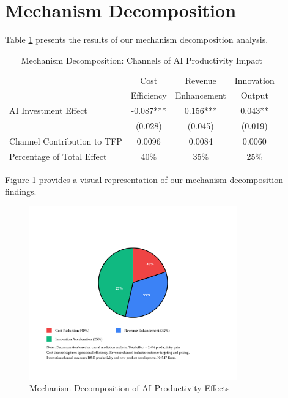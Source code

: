 \documentclass[12pt]{article}
\begin{document}
\section{Mechanism Decomposition}

Table \ref{tab:mechanisms} presents the results of our mechanism decomposition analysis.

\begin{table}[H]
\centering
\caption{Mechanism Decomposition: Channels of AI Productivity Impact}
\label{tab:mechanisms}
\begin{tabular}{lccc}
\toprule
 & Cost & Revenue & Innovation \\
 & Efficiency & Enhancement & Output \\
\midrule
AI Investment Effect & -0.087*** & 0.156*** & 0.043** \\
 & (0.028) & (0.045) & (0.019) \\
\midrule
Channel Contribution to TFP & 0.0096 & 0.0084 & 0.0060 \\
Percentage of Total Effect & 40\% & 35\% & 25\% \\
\bottomrule
\end{tabular}
\end{table}

Figure \ref{fig:mechanism_decomp} provides a visual representation of our mechanism decomposition findings.

\begin{figure}[H]
\centering
\includegraphics[width=0.8\textwidth]{figures/figure2_mechanism_decomposition.svg}
\caption{Mechanism Decomposition of AI Productivity Effects}
\label{fig:mechanism_decomp}
\end{figure}
\end{document}
